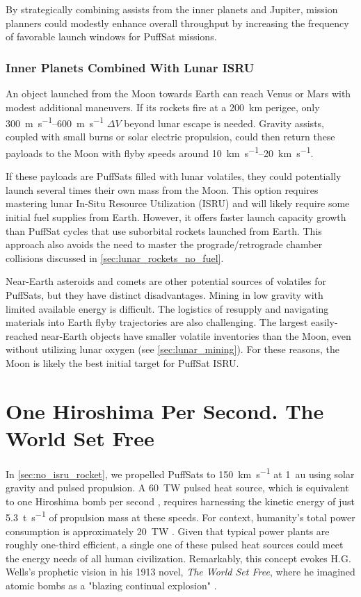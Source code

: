 \documentclass{article}
\begin{document}
{By strategically combining assists from the inner planets and Jupiter, mission planners could modestly enhance overall throughput by increasing the frequency of favorable launch windows for PuffSat missions.

\subsubsection{Inner Planets Combined With Lunar ISRU}
An object launched from the Moon towards Earth can reach Venus or Mars with modest additional maneuvers.  If its rockets fire at a \SI{200}{\kilo\meter} perigee, only \SIrange{300}{600}{\meter\per\second} $\Delta V$ beyond lunar escape is needed.  Gravity assists, coupled with small burns or solar electric propulsion, could then return these payloads to the Moon with flyby speeds around \SIrange{10}{20}{\kilo\meter\per\second}.

If these payloads are PuffSats filled with lunar volatiles, they could potentially launch several times their own mass from the Moon. This option requires mastering lunar In-Situ Resource Utilization (ISRU) and will likely require some initial fuel supplies from Earth. However, it offers faster launch capacity growth than PuffSat cycles that use suborbital rockets launched from Earth. This approach also avoids the need to master the prograde/retrograde chamber collisions discussed in \autoref{sec:lunar_rockets_no_fuel}.

Near-Earth asteroids and comets are other potential sources of volatiles for PuffSats, but they have distinct disadvantages. Mining in low gravity with limited available energy is difficult.  The logistics of resupply and navigating materials into Earth flyby trajectories are also challenging. The largest easily-reached near-Earth objects have smaller volatile inventories than the Moon, even without utilizing lunar oxygen (see \autoref{sec:lunar_mining}). For these reasons, the Moon is likely the best initial target for PuffSat ISRU.

\section{One Hiroshima Per Second. The World Set Free}\label{sec:world_set_free}
In \autoref{sec:no_isru_rocket}, we propelled PuffSats to \SI{150}{\kilo\meter\per\second} at \SI{1}{\astronomicalunit} using solar gravity and pulsed propulsion. A \SI{60}{\tera\watt} pulsed heat source, which is equivalent to one Hiroshima bomb per second \cite{hiroshima}, requires harnessing the kinetic energy of just \SI{5.3}{\tonne\per\second} of propulsion mass at these speeds. For context, humanity's total power consumption is approximately \SI{20}{\tera\watt} \cite{owid-energy-production-consumption}. Given that typical power plants are roughly one-third efficient, a single one of these pulsed heat sources could meet the energy needs of all human civilization.  Remarkably, this concept evokes H.G. Wells's prophetic vision in his 1913 novel, \textit{The World Set Free}, where he imagined atomic bombs as a "blazing continual explosion" \cite{wells1914world}.  

}
\end{document}
